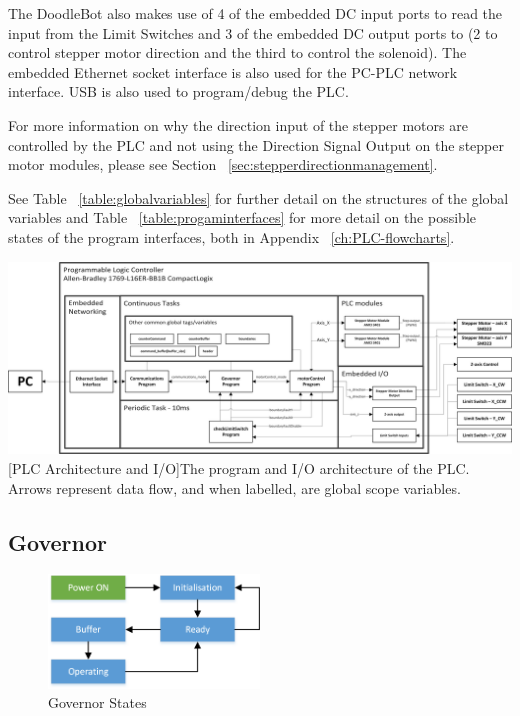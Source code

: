 		The DoodleBot also makes use of 4 of the embedded DC input ports to read the input from the Limit Switches and 3 of the embedded DC output ports to (2 to control stepper motor direction and the third to control the solenoid). The embedded Ethernet socket interface is also used for the PC-PLC network interface. USB is also used to program/debug the PLC. 
		
		For more information on why the direction input of the stepper motors are controlled by the PLC and not using the Direction Signal Output on the stepper motor modules, please see Section ~\ref{sec:stepperdirectionmanagement}.
		
				See Table ~\ref{table:globalvariables} for further detail on the structures of the global variables and Table ~\ref{table:progaminterfaces} for more detail on the possible states of the program interfaces, both in Appendix ~\ref{ch:PLC-flowcharts}.
		

\begin{landscape}
		\vspace*{\fill}
		\includegraphics[width=\hsize]{figures/cncMachine/PLC_architecture}
		[PLC Architecture and I/O]{The program and I/O architecture of the PLC. Arrows represent data flow, and when labelled, are global scope variables.}
		\label{fig:PLCarchitecture}
		\vspace*{\fill}
\end{landscape}



	\subsection{Governor}
	
		\begin{figure}[h]
			\centering
			\includegraphics[width=0.5\textwidth]{figures/cncMachine/governor_simple.png}
			\caption{Governor States}
			\label{fig:governor-states}
		\end{figure}
		
